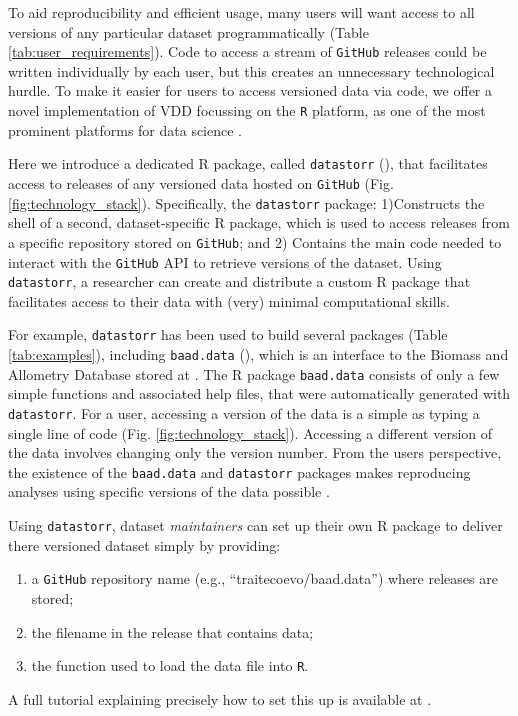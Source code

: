 \documentclass[a4paper,num-refs]{assets/oup-contemporary}
\begin{document}
To aid reproducibility and efficient usage, many users will want access to all versions of any particular dataset programmatically (Table \ref{tab:user_requirements}). Code to access a stream of \texttt{GitHub} releases could be written individually by each user, but this creates an unnecessary technological hurdle. To make it easier for users to access versioned data via code, we offer a novel implementation of VDD focussing on the \texttt{R} platform, as one of the most prominent platforms for data science \cite{R-2017}.

Here we introduce a dedicated \textsc{R} package, called \texttt{datastorr} (), that facilitates access to releases of any versioned data hosted on \texttt{GitHub} (Fig. \ref{fig:technology_stack}). Specifically, the \texttt{datastorr} package: 1)Constructs the shell of a second, dataset-specific \textsc{R} package, which is used to access releases from a specific repository stored on \texttt{GitHub}; and 2) Contains the main code needed to interact with the \texttt{GitHub} API to retrieve versions of the dataset. 
Using \texttt{datastorr}, a researcher can create and distribute a custom \textsc{R} package that facilitates access to their data with (very) minimal computational skills.

For example, \texttt{datastorr} has been used to build several packages (Table \ref{tab:examples}), including \texttt{baad.data} (), which is an interface to the Biomass and Allometry Database \cite{Falster-2015} stored at . The R package \texttt{baad.data} consists of only a few simple functions and associated help files, that were automatically generated with \texttt{datastorr}. For a user, accessing a version of the data is a simple as typing a single line of code (Fig. \ref{fig:technology_stack}). Accessing a different version of the data involves changing only the version number. From the users perspective, the existence of the \texttt{baad.data} and \texttt{datastorr} packages makes reproducing analyses using specific versions of the data possible \cite{Duursma-2016,Falster-2016}.


Using \texttt{datastorr}, dataset \emph{maintainers} can set up their own R package to deliver there versioned dataset simply by providing:
\begin{enumerate}
  \item a \texttt{GitHub} repository name (e.g., ``traitecoevo/baad.data'') where releases are stored;
  \item the filename in the release that contains data;
  \item the function used to load the data file into \texttt{R}.
\end{enumerate}
A full tutorial explaining precisely how to set this up is available at .
\end{document}

